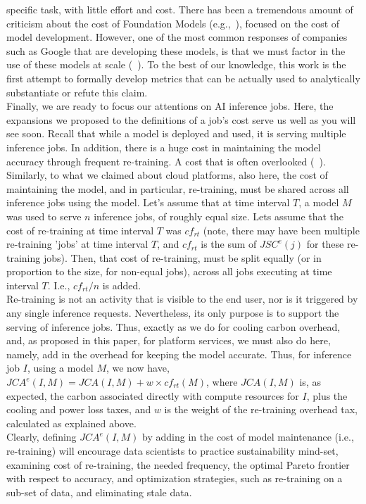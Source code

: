 specific task, with little effort and cost. 
There has been a tremendous amount of criticism about the cost of Foundation Models (e.g.,~\cite{}), focused on the cost of model development. However, one of the 
most common responses of companies such as Google that are developing these models, is that we must factor in the use of these models at scale (~\cite{}). 
To the best of our knowledge, this work is the first attempt to formally develop metrics that can be actually used 
to analytically substantiate or refute this claim. 
\\
Finally, we are ready to focus our attentions on AI inference jobs. Here, the expansions we proposed to the definitions of a job's cost serve us well as you will see soon. 
Recall that while a model is deployed and used, it is serving multiple inference jobs. In addition, there is a huge cost in maintaining the model accuracy through frequent re-training. A
cost that is often overlooked (~\cite{}). 
Similarly, to what we claimed about 
cloud platforms, also here, the cost of maintaining the model, and in particular, re-training, must be shared across all inference jobs using the model. Let's assume that at time interval $T$, a model $M$ was used to serve $n$ inference jobs, of roughly equal size. Lets assume that the cost of re-training at time interval $T$ was $cf_{rt}$ (note, there may have been multiple re-training 'jobs' at time interval $T$, and $cf_{rt}$ is the sum of $JSC^e(j)$ for these re-training jobs). 
Then, that cost of re-training, must be split equally (or in proportion to the size, for non-equal jobs), across all jobs executing at time interval $T$. I.e., $cf_{rt}/n$ is added.
\\
Re-training is not an
activity that is visible to the end user, nor is it triggered 
by any single inference requests. Nevertheless, its only purpose 
is to support the serving of inference jobs. Thus, exactly as we do for cooling carbon overhead, and, as proposed in this paper, 
for platform services, we must also do here, namely, add in the overhead for keeping the model accurate. Thus, for inference job $I$, using a model $M$, we now have, $JCA^e(I,M) =JCA(I,M) + w \times cf_{rt}(M)$, where $JCA(I,M)$ is, as expected, the carbon associated directly with compute resources for $I$, plus the cooling and power loss taxes, and $w$ is the weight of the re-training overhead tax, calculated as explained above. 
\\
Clearly, defining $JCA^e(I,M)$ by adding in the cost of model maintenance (i.e., re-training) will encourage data scientists to practice sustainability mind-set, examining cost of re-training, the needed frequency, the optimal Pareto frontier with respect to accuracy, and optimization strategies, such as re-training on a sub-set of data, and eliminating stale data.  

